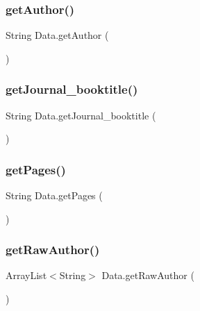 \hypertarget{class_data_a4163034911e6f4b0b3e4bd2135824c5f}{}\label{class_data_a4163034911e6f4b0b3e4bd2135824c5f} 
\subsubsection{\texorpdfstring{get\+Author()}{getAuthor()}}
{\footnotesize\ttfamily String Data.\+get\+Author (\begin{DoxyParamCaption}{ }\end{DoxyParamCaption})}

\hypertarget{class_data_ac1e4612845513c0826716962bcad943c}{}\label{class_data_ac1e4612845513c0826716962bcad943c} 
\subsubsection{\texorpdfstring{get\+Journal\+\_\+booktitle()}{getJournal\_booktitle()}}
{\footnotesize\ttfamily String Data.\+get\+Journal\+\_\+booktitle (\begin{DoxyParamCaption}{ }\end{DoxyParamCaption})}

\hypertarget{class_data_a7c34cb99f132d8fb526462d59a033aa8}{}\label{class_data_a7c34cb99f132d8fb526462d59a033aa8} 
\subsubsection{\texorpdfstring{get\+Pages()}{getPages()}}
{\footnotesize\ttfamily String Data.\+get\+Pages (\begin{DoxyParamCaption}{ }\end{DoxyParamCaption})}

\hypertarget{class_data_a3e01a97f8e6695e9ae4bbdfb4e012127}{}\label{class_data_a3e01a97f8e6695e9ae4bbdfb4e012127} 
\subsubsection{\texorpdfstring{get\+Raw\+Author()}{getRawAuthor()}}
{\footnotesize\ttfamily Array\+List$<$String$>$ Data.\+get\+Raw\+Author (\begin{DoxyParamCaption}{ }\end{DoxyParamCaption})}

